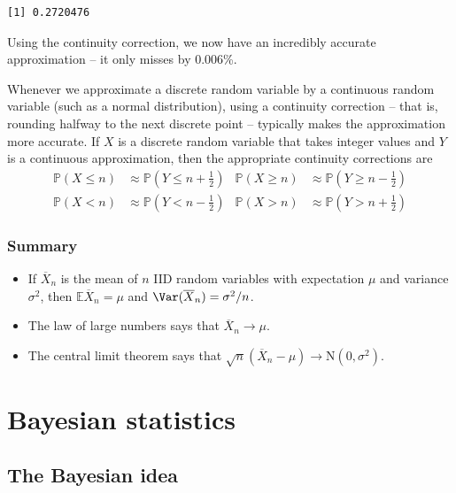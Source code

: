 \documentclass[
  letterpaper,
]{report}
\providecommand{\tightlist}{%
  \setlength{\itemsep}{0pt}\setlength{\parskip}{0pt}}\usepackage{longtable,booktabs,array}
\theoremstyle{definition}
\theoremstyle{definition}
\theoremstyle{remark}
\begin{document}
\begin{verbatim}
[1] 0.2720476
\end{verbatim}

Using the continuity correction, we now have an incredibly accurate
approximation -- it only misses by 0.006\%.

Whenever we approximate a discrete random variable by a continuous
random variable (such as a normal distribution), using a continuity
correction -- that is, rounding halfway to the next discrete point --
typically makes the approximation more accurate. If \(X\) is a discrete
random variable that takes integer values and \(Y\) is a continuous
approximation, then the appropriate continuity corrections are
\begin{align*}
\mathbb P(X \leq n) &\approx \mathbb P(Y \leq n + \tfrac12) & \mathbb P(X \geq n) &\approx \mathbb P(Y \geq n - \tfrac12) \\
\mathbb P(X < n) &\approx \mathbb P(Y < n - \tfrac12) & \mathbb P(X > n) &\approx \mathbb P(Y > n + \tfrac12) 
\end{align*}

\hypertarget{summary-09}{%
\section*{Summary}\label{summary-09}}


\begin{itemize}
\tightlist
\item
  If \(\overline X_n\) is the mean of \(n\) IID random variables with
  expectation \(\mu\) and variance \(\sigma^2\), then
  \(\mathbb E\overline X_n = \mu\) and
  \(\Var(\overline X_n) = \sigma^2/n\).
\item
  The law of large numbers says that \(\overline X_n \to \mu\).
\item
  The central limit theorem says that
  \(\sqrt{n}(\overline X_n - \mu) \to \text{N}(0, \sigma^2)\).
\end{itemize}

\part{Bayesian statistics}

\hypertarget{L19-bayes-idea}{%
\chapter{The Bayesian idea}\label{L19-bayes-idea}}
\end{document}
